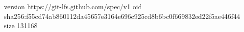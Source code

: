 version https://git-lfs.github.com/spec/v1
oid sha256:f55cd74ab860112da45657e3164e696c925cd8b6bc0f669832ed22f5ae446f44
size 131168
